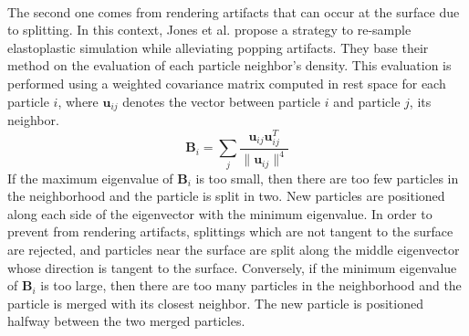 \\
The second one comes from rendering artifacts that can occur at the surface due to splitting. In this context, Jones et al. \cite{Jones:2014:DEF} propose a strategy to re-sample elastoplastic simulation while alleviating popping artifacts. They base their method on the evaluation of each particle neighbor's density. This evaluation is performed using a weighted covariance matrix computed in rest space for each particle $i$, where $\mathbf{u}_{ij}$ denotes the vector between particle $i$ and particle $j$, its neighbor.
\begin{equation}
\label{eq:jones_re-sampling}
\mathbf{B}_{i} = \sum_{j}  \frac{\mathbf{u}_{ij}\mathbf{u}_{ij}^{T}}{\| \mathbf{u}_{ij} \|^{4}}
\end{equation}
If the maximum eigenvalue of $\mathbf{B}_{i}$ is too small, then there are too few particles in the neighborhood and the particle is split in two. New particles are positioned along each side of the eigenvector with the minimum eigenvalue. In order to prevent from rendering artifacts, splittings which are not tangent to the surface are rejected, and particles near the surface are split along the middle eigenvector whose direction is tangent to the surface. Conversely, if the minimum eigenvalue of $\mathbf{B}_{i}$ is too large, then there are too many particles in the neighborhood and the particle is merged with its closest neighbor. The new particle is positioned halfway between the two merged particles.

